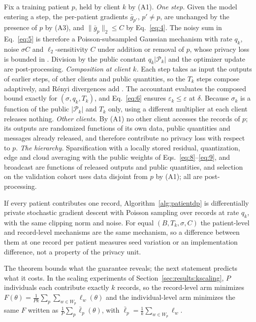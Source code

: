 \begin{IEEEproof}
Fix a training patient $p$, held by client $k$ by (A1). \emph{One step.} Given
the model entering a step, the per-patient gradients $\bar g_{p'}$,
$p' \neq p$, are unchanged by the presence of $p$ by (A3), and
$\lVert \bar g_p \rVert_2 \le C$ by Eq.~\eqref{eq:4}. The noisy sum in
Eq.~\eqref{eq:5} is therefore a Poisson-subsampled Gaussian mechanism with rate
$q_k$, noise $\sigma C$ and $\ell_2$-sensitivity $C$ under addition or removal
of $p$, whose privacy loss is bounded in \cite{ref29, ref33}. Division by the
public constant $q_k|\mathcal{P}_k|$ and the optimizer update are
post-processing. \emph{Composition at client $k$.} Each step takes as input the
outputs of earlier steps, of other clients and public quantities, so the $T_k$
steps compose adaptively, and R\'enyi divergences add \cite{ref7}. The
accountant evaluates the composed bound exactly for $(\sigma,q_k,T_k)$, and
Eq.~\eqref{eq:6} ensures $\varepsilon_k \le \varepsilon$ at
$\delta$. Because $\sigma_k$ is a function of the public $|\mathcal{P}_k|$ and
$T_k$ only, using a different multiplier at each client releases nothing. \emph{Other clients.} By (A1) no other client accesses
the records of $p$; its outputs are randomized functions of its own data,
public quantities and messages already released, and therefore contribute no
privacy loss with respect to $p$. \emph{The hierarchy.} Sparsification with a
locally stored residual, quantization, edge and cloud averaging with the public
weights of Eqs.~\eqref{eq:8}--\eqref{eq:9}, and broadcast are functions of
released outputs and public quantities, and selection on the validation cohort
uses data disjoint from $p$ by (A1); all are post-processing.
\end{IEEEproof}

\begin{corollary}
\label{cor:k1}
If every patient contributes one record, Algorithm~\ref{alg:patientdp} is
differentially private stochastic gradient descent with Poisson sampling over
records at rate $q_k$, with the same clipping norm and noise. For equal
$(B, T_k, \sigma, C)$ the patient-level and record-level mechanisms are the
same mechanism, so a difference between them at one record per patient
measures seed variation or an implementation difference, not a property of the
privacy unit.
\end{corollary}

The theorem bounds what the guarantee reveals; the next statement predicts what
it costs. In the scaling experiments of Section~\ref{sec:results:kscaling},
$P$ individuals each contribute exactly $k$ records, so the record-level arm
minimizes $F(\theta) = \frac{1}{Pk}\sum_{p}\sum_{w \in W_p} \ell_w(\theta)$
and the individual-level arm minimizes the same $F$ written as
$\frac{1}{P}\sum_p \bar\ell_p(\theta)$, with
$\bar\ell_p = \frac{1}{k}\sum_{w\in W_p}\ell_w$.

